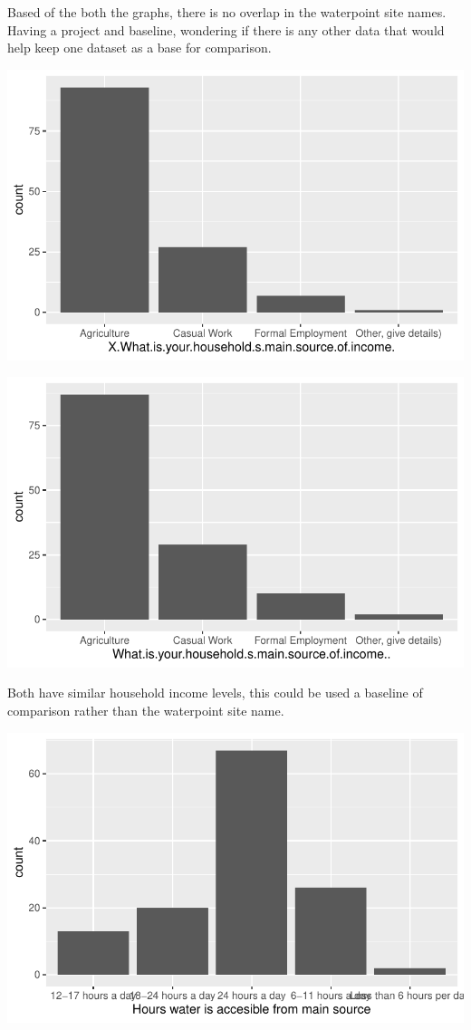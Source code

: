 \documentclass[
  letterpaper,
  DIV=11,
  numbers=noendperiod]{scrartcl}
\begin{document}
Based of the both the graphs, there is no overlap in the waterpoint site
names. Having a project and baseline, wondering if there is any other
data that would help keep one dataset as a base for comparison.

\includegraphics{report_files/figure-pdf/unnamed-chunk-9-1.pdf}

\includegraphics{report_files/figure-pdf/unnamed-chunk-10-1.pdf}

Both have similar household income levels, this could be used a baseline
of comparison rather than the waterpoint site name.

\includegraphics{report_files/figure-pdf/unnamed-chunk-11-1.pdf}
\end{document}
